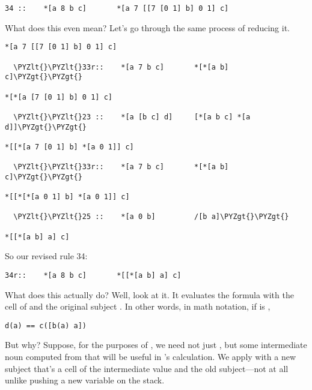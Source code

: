 \begin{framed_shaded}
\begin{Verbatim}[fontsize=\relsize{-2.5},fontseries=b,commandchars=\\\{\}]
34 ::    *[a 8 b c]       *[a 7 [[7 [0 1] b] 0 1] c]
\end{Verbatim}
\end{framed_shaded}
What does this even mean?  Let's go through the same process
of reducing it.

\begin{framed_shaded}
\begin{Verbatim}[fontsize=\relsize{-2.5},fontseries=b,commandchars=\\\{\}]
*[a 7 [[7 [0 1] b] 0 1] c]

  \PYZlt{}\PYZlt{}33r::    *[a 7 b c]       *[*[a b] c]\PYZgt{}\PYZgt{}

*[*[a [7 [0 1] b] 0 1] c]

  \PYZlt{}\PYZlt{}23 ::    *[a [b c] d]     [*[a b c] *[a d]]\PYZgt{}\PYZgt{}

*[[*[a 7 [0 1] b] *[a 0 1]] c]

  \PYZlt{}\PYZlt{}33r::    *[a 7 b c]       *[*[a b] c]\PYZgt{}\PYZgt{}

*[[*[*[a 0 1] b] *[a 0 1]] c]

  \PYZlt{}\PYZlt{}25 ::    *[a 0 b]         /[b a]\PYZgt{}\PYZgt{}

*[[*[a b] a] c]
\end{Verbatim}
\end{framed_shaded}
So our revised rule 34:

\begin{framed_shaded}
\begin{Verbatim}[fontsize=\relsize{-2.5},fontseries=b,commandchars=\\\{\}]
34r::    *[a 8 b c]       *[[*[a b] a] c]
\end{Verbatim}
\end{framed_shaded}
What does this actually do?  Well, look at it.  It evaluates the
formula  with the cell of \kode{*[a b]} and the original subject
.  In other words, in math notation, if  is \kode{[8 b c]},

\begin{framed_shaded}
\begin{Verbatim}[fontsize=\relsize{-2.5},fontseries=b,commandchars=\\\{\}]
d(a) == c([b(a) a])
\end{Verbatim}
\end{framed_shaded}
But why?  Suppose, for the purposes of , we need not just ,
but some intermediate noun computed from  that will be useful
in 's calculation.  We apply  with a new subject that's a
cell of the intermediate value and the old subject---not at all
unlike pushing a new variable on the stack.

